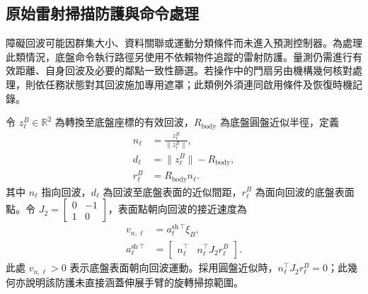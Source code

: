 \subsection{原始雷射掃描防護與命令處理}
\label{subsec:raw_scan_command_protection}

障礙回波可能因群集大小、資料關聯或運動分類條件而未進入預測控制器。為處理此類情況，底盤命令執行路徑另使用不依賴物件追蹤的雷射防護。量測仍需進行有效距離、自身回波及必要的鄰點一致性篩選。若操作中的門扇另由機構幾何核對處理，則依任務狀態對其回波施加專用遮罩；此類例外須連同啟用條件及恢復時機記錄。

令 $z_{\ell}^{B}\in\mathbb{R}^{2}$ 為轉換至底盤座標的有效回波，$R_{\mathrm{body}}$ 為底盤圓盤近似半徑，定義
\begin{equation}
    \begin{aligned}
        n_{\ell}
        &=\frac{z_{\ell}^{B}}{\|z_{\ell}^{B}\|}, \\
        d_{\ell}
        &=\|z_{\ell}^{B}\|-R_{\mathrm{body}}, \\
        r_{\ell}^{B}
        &=R_{\mathrm{body}}n_{\ell}.
    \end{aligned}
    \label{eq:ch3_scan_surface_geometry}
\end{equation}
其中 $n_{\ell}$ 指向回波，$d_{\ell}$ 為回波至底盤表面的近似間距，$r_{\ell}^{B}$ 為面向回波的底盤表面點。令 $J_2=\begin{bmatrix}0&-1\\1&0\end{bmatrix}$，表面點朝向回波的接近速度為
\begin{equation}
    \begin{aligned}
        v_{n,\ell}
        &=a_{\ell}^{\mathrm{sh}\,\top}\xi_B, \\
        a_{\ell}^{\mathrm{sh}\,\top}
        &=\begin{bmatrix}
            n_{\ell}^{\top} & n_{\ell}^{\top}J_2r_{\ell}^{B}
          \end{bmatrix}.
    \end{aligned}
    \label{eq:ch3_scan_approach_velocity}
\end{equation}
此處 $v_{n,\ell}>0$ 表示底盤表面朝向回波運動。採用圓盤近似時，$n_{\ell}^{\top}J_2r_{\ell}^{B}=0$；此幾何亦說明該防護未直接涵蓋伸展手臂的旋轉掃掠範圍。

